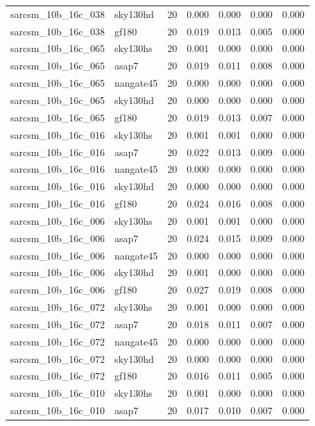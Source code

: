 \begin{tabular}{llrrrrr}
sarcsm\_10b\_16c\_038 & sky130hd & 20 & 0.000 & 0.000 & 0.000 & 0.000 \\
sarcsm\_10b\_16c\_038 & gf180 & 20 & 0.019 & 0.013 & 0.005 & 0.000 \\
sarcsm\_10b\_16c\_065 & sky130hs & 20 & 0.001 & 0.000 & 0.000 & 0.000 \\
sarcsm\_10b\_16c\_065 & asap7 & 20 & 0.019 & 0.011 & 0.008 & 0.000 \\
sarcsm\_10b\_16c\_065 & nangate45 & 20 & 0.000 & 0.000 & 0.000 & 0.000 \\
sarcsm\_10b\_16c\_065 & sky130hd & 20 & 0.000 & 0.000 & 0.000 & 0.000 \\
sarcsm\_10b\_16c\_065 & gf180 & 20 & 0.019 & 0.013 & 0.007 & 0.000 \\
sarcsm\_10b\_16c\_016 & sky130hs & 20 & 0.001 & 0.001 & 0.000 & 0.000 \\
sarcsm\_10b\_16c\_016 & asap7 & 20 & 0.022 & 0.013 & 0.009 & 0.000 \\
sarcsm\_10b\_16c\_016 & nangate45 & 20 & 0.000 & 0.000 & 0.000 & 0.000 \\
sarcsm\_10b\_16c\_016 & sky130hd & 20 & 0.000 & 0.000 & 0.000 & 0.000 \\
sarcsm\_10b\_16c\_016 & gf180 & 20 & 0.024 & 0.016 & 0.008 & 0.000 \\
sarcsm\_10b\_16c\_006 & sky130hs & 20 & 0.001 & 0.001 & 0.000 & 0.000 \\
sarcsm\_10b\_16c\_006 & asap7 & 20 & 0.024 & 0.015 & 0.009 & 0.000 \\
sarcsm\_10b\_16c\_006 & nangate45 & 20 & 0.000 & 0.000 & 0.000 & 0.000 \\
sarcsm\_10b\_16c\_006 & sky130hd & 20 & 0.001 & 0.000 & 0.000 & 0.000 \\
sarcsm\_10b\_16c\_006 & gf180 & 20 & 0.027 & 0.019 & 0.008 & 0.000 \\
sarcsm\_10b\_16c\_072 & sky130hs & 20 & 0.001 & 0.000 & 0.000 & 0.000 \\
sarcsm\_10b\_16c\_072 & asap7 & 20 & 0.018 & 0.011 & 0.007 & 0.000 \\
sarcsm\_10b\_16c\_072 & nangate45 & 20 & 0.000 & 0.000 & 0.000 & 0.000 \\
sarcsm\_10b\_16c\_072 & sky130hd & 20 & 0.000 & 0.000 & 0.000 & 0.000 \\
sarcsm\_10b\_16c\_072 & gf180 & 20 & 0.016 & 0.011 & 0.005 & 0.000 \\
sarcsm\_10b\_16c\_010 & sky130hs & 20 & 0.001 & 0.000 & 0.000 & 0.000 \\
sarcsm\_10b\_16c\_010 & asap7 & 20 & 0.017 & 0.010 & 0.007 & 0.000 \\

\end{tabular}
